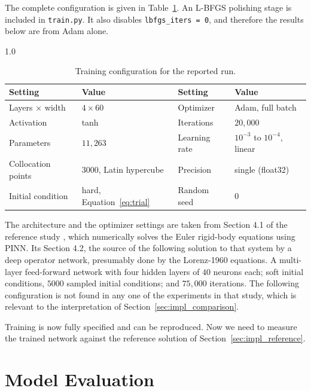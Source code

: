 The complete configuration is given in Table~\ref{tab:pinn_hyper}. An L-BFGS polishing stage is included in \texttt{train.py}. It also disables  \texttt{lbfgs\_iters = 0}, and therefore the results below are from Adam alone.

\begin{table}[H]
\centering
\caption{Training configuration for the reported run.}
\label{tab:pinn_hyper}
\begin{spacing}{1.0}
\small
\begin{tabular}{|l|l|l|l|}
\hline
\textbf{Setting} & \textbf{Value} & \textbf{Setting} & \textbf{Value} \\
\hline
Layers $\times$ width & $4 \times 60$ & Optimizer & Adam, full batch \\
\hline
Activation & tanh & Iterations & $20{,}000$ \\
\hline
Parameters & $11{,}263$ & Learning rate & $10^{-3}$ to $10^{-4}$, linear \\
\hline
Collocation points & $3000$, Latin hypercube & Precision & single (float32) \\
\hline
Initial condition & hard, Equation~\ref{eq:trial} & Random seed & $0$ \\
\hline
\end{tabular}
\end{spacing}
\end{table}

The architecture and the optimizer settings are taken from Section 4.1 of the reference study \cite{matthews2024pinnde}, which numerically solves the Euler rigid-body equations using PINN. Its Section 4.2, the source of the following solution to that system by a deep operator network, presumably done by the Lorenz-1960 equations. A multi-layer feed-forward network with four hidden layers of $40$ neurons each; soft initial conditions, $5000$ sampled initial conditions; and $75{,}000$ iterations. The following configuration is not found in any one of the experiments in that study, which is relevant to the interpretation of Section~\ref{sec:impl_comparison}.

Training is now fully specified and can be reproduced. Now we need to measure the trained network against the reference solution of Section~\ref{sec:impl_reference}.


\section{Model Evaluation}
\label{sec:impl_evaluation}

